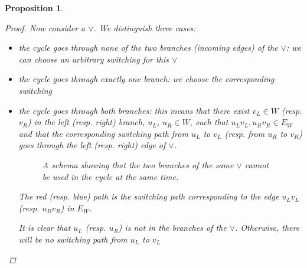 \documentclass[conference,twosided,10pt]{IEEEtran}
\newtheorem{proposition}[thm]{Proposition}
\theoremstyle{definition}
\newcommand{\cor}{\vee}
\begin{document}
\begin{proposition}
\begin{proof}
  Now consider a $\cor$. We distinguish three cases:
  \begin{itemize}
    \item the cycle goes through none of the two branches (incoming edges) of
	    the $\cor$: we can choose an
	    arbitrary switching for this $\cor$
    \item the cycle goes through exactly one branch: we choose the corresponding
	    switching
    \item the cycle goes through both branches:
	    this means that there exist $v_L \in W$ (resp. $v_R$) in the left
		  (resp. right) branch, $u_L$, $u_R \in W$, such that
		  $u_Lv_L, u_Rv_R \in E_W$ and that the corresponding switching
		  path from $u_L$ to $v_L$ (resp. from $u_R$ to $v_R$) goes
		  through the left (resp. right) edge of $\cor$.

\begin{figure}[h]
    \begin{center}	
    
    \caption{A schema showing that the two branches of the same $\cor$ cannot be
	    used in the cycle at the same time.}
\end{center}
\end{figure}
    
    The red (resp. blue) path is the switching path corresponding to the edge $u_Lv_L$ (resp. $u_Rv_R$) in $E_W$.  
    
    It is clear that $u_L$ (resp. $u_R$) is not in the branches of the
	 $\cor$. Otherwise, there will be no switching path from $u_L$ to $v_L$ 


\end{itemize}
\end{proof}
\end{proposition}
\end{document}
